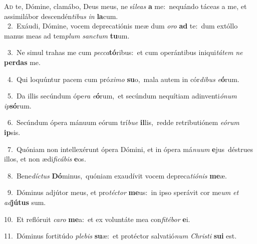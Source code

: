 \lettrine{\initial\textcolor{\initialcolor}{A}}{d} te, Dómine, clamábo, Deus meus, ne sí\-\textit{le}\-\textit{as} \textbf{a} me:~\star nequándo táceas a me, et assimilábor descendén\-\textit{ti}\-\textit{bus} \textit{in} \textbf{la}\-cum.\\
{\numbfont\textcolor{\numbcolor}{~2.}}~Exáudi, Dómine, vocem deprecatiónis meæ dum \textit{o}\-\textit{ro} \textbf{ad} te:~\star dum extóllo manus meas ad tem\textit{plum} \textit{sanc}\-\textit{tum} \textbf{tu}\-um.\par
{\numbfont\textcolor{\numbcolor}{~3.}}~Ne simul trahas me cum \textit{pec}\-\textit{ca}\textbf{tó}ribus:~\star et cum operántibus iniqui\-\textit{tá}\-\textit{tem} \textit{ne} \textbf{per}\-\textbf{das} me.\par
{\numbfont\textcolor{\numbcolor}{~4.}}~Qui loquúntur pacem cum pró\-\textit{xi}\-\textit{mo} \textbf{su}\-o,~\star mala autem in cór\-\textit{di}\-\textit{bus} \textit{e}\-\textbf{ó}rum.\par
{\numbfont\textcolor{\numbcolor}{~5.}}~Da illis secúndum ópe\textit{ra} \textit{e}\-\textbf{ó}rum,~\star et secúndum nequítiam adinventi\-\textit{ó}\-\textit{num} \textit{ip}\-\textbf{só}rum.\par
{\numbfont\textcolor{\numbcolor}{~6.}}~Secúndum ópera mánuum eórum trí\-\textit{bu}\-\textit{e} \textbf{il}\-lis,~\star redde retributiónem \textit{e}\-\textit{ó}\textit{rum} \textbf{ip}\-sis.\par
{\numbfont\textcolor{\numbcolor}{~7.}}~Quóniam non intellexérunt ópera Dómini, et in ópera má\-\textit{nu}\-\textit{um} \textbf{e}\-jus~\star déstrues illos, et non ædi\-\textit{fi}\-\textit{cá}\textit{bis} \textbf{e}\-os.\par
{\numbfont\textcolor{\numbcolor}{~8.}}~Bene\-\textit{díc}\-\textit{tus} \textbf{Dó}\-minus,~\star quóniam exaudívit vocem depreca\-\textit{ti}\-\textit{ó}\textit{nis} \textbf{me}\-æ.\par
{\numbfont\textcolor{\numbcolor}{~9.}}~Dóminus adjútor meus, et pro\-\textit{téc}\-\textit{tor} \textbf{me}\-us:~\star in ipso sperávit cor me\textit{um} \textit{et} \textit{ad}\-\textbf{jú}\textbf{tus} sum.\par
{\numbfont\textcolor{\numbcolor}{10.}}~Et reflóruit \textit{ca}\-\textit{ro} \textbf{me}\-a:~\star et ex voluntáte mea con\-\textit{fi}\-\textit{té}\textit{bor} \textbf{e}\-i.\par
{\numbfont\textcolor{\numbcolor}{11.}}~Dóminus fortitúdo \textit{ple}\-\textit{bis} \textbf{su}\-æ:~\star et protéctor salvatió\textit{num} \textit{Chris}\-\textit{ti} \textbf{su}\-\textbf{i} est.\par
